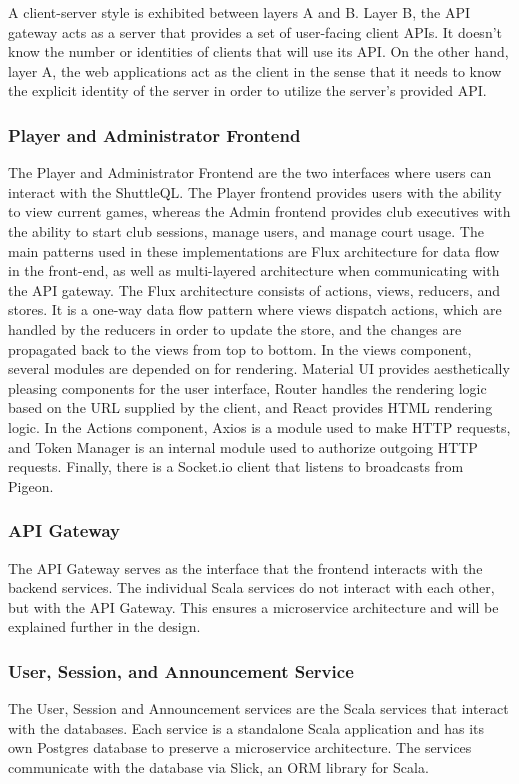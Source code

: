 \documentclass{article}
\begin{document}
A client-server style is exhibited between layers A and B. Layer B, the API gateway acts as a server that provides a set of user-facing client APIs. It doesn't know the number or identities of clients that will use its API. On the other hand, layer A, the web applications act as the client in the sense that it needs to know the explicit identity of the server in order to utilize the server's provided API.

\subsubsection{Player and Administrator Frontend}
The Player and Administrator Frontend are the two interfaces where users can interact with the ShuttleQL. The Player frontend provides users with the ability to view current games, whereas the Admin frontend provides club executives with the ability to start club sessions, manage users, and manage court usage. The main patterns used in these implementations are Flux architecture for data flow in the front-end, as well as multi-layered architecture when communicating with the API gateway. The Flux architecture consists of actions, views, reducers, and stores. It is a one-way data flow pattern where views dispatch actions, which are handled by the reducers in order to update the store, and the changes are propagated back to the views from top to bottom. In the views component, several modules are depended on for rendering. Material UI provides aesthetically pleasing components for the user interface, Router handles the rendering logic based on the URL supplied by the client, and React provides HTML rendering logic. In the Actions component, Axios is a module used to make HTTP requests, and Token Manager is an internal module used to authorize outgoing HTTP requests. Finally, there is a Socket.io client that listens to broadcasts from Pigeon.

\subsubsection{API Gateway}
The API Gateway serves as the interface that the frontend interacts with the backend services. The individual Scala services do not interact with each other, but with the API Gateway. This ensures a microservice architecture and will be explained further in the design.

\subsubsection{User, Session, and Announcement Service}
The User, Session and Announcement services are the Scala services that interact with the databases. Each service is a standalone Scala application and has its own Postgres database to preserve a microservice architecture. The services communicate with the database via Slick, an ORM library for Scala.
\end{document}
